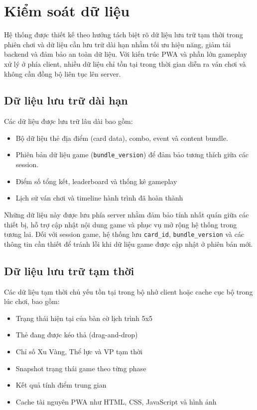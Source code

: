 \newpage

\section{Kiểm soát dữ liệu}

Hệ thống được thiết kế theo hướng tách biệt rõ dữ liệu lưu trữ tạm thời trong phiên chơi và dữ liệu cần lưu trữ dài hạn nhằm tối ưu hiệu năng, giảm tải backend và đảm bảo an toàn dữ liệu. Với kiến trúc PWA và phần lớn gameplay xử lý ở phía client, nhiều dữ liệu chỉ tồn tại trong thời gian diễn ra ván chơi và không cần đồng bộ liên tục lên server.

\subsection{Dữ liệu lưu trữ dài hạn}

Các dữ liệu được lưu trữ lâu dài bao gồm:

\begin{itemize}[topsep=0pt, itemsep=2pt, leftmargin=1.2cm]
    \item Bộ dữ liệu thẻ địa điểm (card data), combo, event và content bundle.
    \item Phiên bản dữ liệu game (\texttt{bundle\_version}) để đảm bảo tương thích giữa các session.
    \item Điểm số tổng kết, leaderboard và thống kê gameplay
    \item Lịch sử ván chơi và timeline hành trình đã hoàn thành
\end{itemize}

Những dữ liệu này được lưu phía server nhằm đảm bảo tính nhất quán giữa các thiết bị, hỗ trợ cập nhật nội dung game và phục vụ mở rộng hệ thống trong tương lai. Đối với session game, hệ thống lưu \texttt{card\_id}, \texttt{bundle\_version} và các thông tin cần thiết để tránh lỗi khi dữ liệu game được cập nhật ở phiên bản mới.

\subsection{Dữ liệu lưu trữ tạm thời}

Các dữ liệu tạm thời chủ yếu tồn tại trong bộ nhớ client hoặc cache cục bộ trong lúc chơi, bao gồm:

\begin{itemize}[topsep=0pt, itemsep=2pt, leftmargin=1.2cm]
    \item Trạng thái hiện tại của bàn cờ lịch trình 5x5
    \item Thẻ đang được kéo thả (drag-and-drop)
    \item Chỉ số Xu Vàng, Thể lực và VP tạm thời
    \item Snapshot trạng thái game theo từng phase
    \item Kết quả tính điểm trung gian
    \item Cache tài nguyên PWA như HTML, CSS, JavaScript và hình ảnh
\end{itemize}

